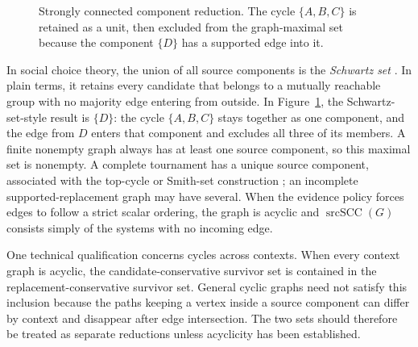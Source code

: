 \documentclass[11pt]{article}
\theoremstyle{remark}
\begin{document}
\begin{figure}[htbp]
\centering
{}
\caption{Strongly connected component reduction. The cycle
$\{A,B,C\}$ is retained as a unit, then excluded from the graph-maximal set
because the component $\{D\}$ has a supported edge into it.}
\label{fig:round-robin-scc}
\end{figure}

In social choice theory, the union of all source components is the
\emph{Schwartz set} \cite{schwartz1972rationality}. In plain terms, it retains
every candidate that belongs to a mutually reachable group with no majority
edge entering from outside. In Figure~\ref{fig:round-robin-scc}, the
Schwartz-set-style result is $\{D\}$: the cycle $\{A,B,C\}$ stays together as
one component, and the edge from $D$ enters that component and excludes all
three of its members. A finite nonempty graph always has at least one source
component, so this maximal set is nonempty. A complete tournament has a unique
source component, associated with the top-cycle or Smith-set construction
\cite{brandt2016computational}; an incomplete supported-replacement graph may
have several. When the evidence policy forces edges to follow a strict scalar
ordering, the graph is acyclic and $\operatorname{srcSCC}(G)$ consists simply
of the systems with no incoming edge.

One technical qualification concerns cycles across contexts. When every
context graph is acyclic, the candidate-conservative survivor set is contained
in the replacement-conservative survivor set. General cyclic graphs need not
satisfy this inclusion because the paths keeping a vertex inside a source
component can differ by context and disappear after edge intersection. The two
sets should therefore be treated as separate reductions unless acyclicity has
been established.
\end{document}
